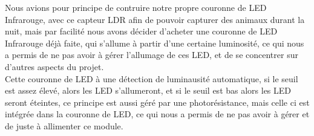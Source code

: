 \begin{table}[H]
    \centering
    \footnotesize
    \setlength{\tabcolsep}{3pt}
    \renewcommand{\arraystretch}{1.15}
    \caption{Comparaison des mesures de luminosite : theorie, calcul numerique et mesures pratiques}
    \label{tab:ldr_comparaison}
\end{table}

Nous avions pour principe de contruire notre propre couronne de LED Infrarouge, avec ce capteur LDR afin de pouvoir capturer des
animaux durant la nuit, mais par facilité nous avons décider d'acheter une couronne de LED Infrarouge déjà faite, 
qui s'allume à partir d'une certaine luminosité, ce qui nous a permis de ne pas avoir à gérer l'allumage de ces LED, et de se 
concentrer sur d'autres aspects du projet.
\\

Cette couronne de LED à une détection de luminausité automatique, si le seuil est assez élevé, alors les LED s'allumeront, 
et si le seuil est bas alors les LED seront éteintes, ce principe est aussi géré par une photorésistance, 
mais celle ci est intégrée dans la couronne de LED, ce qui nous a permis de ne pas avoir à gérer et de juste à allimenter ce module.
\\

